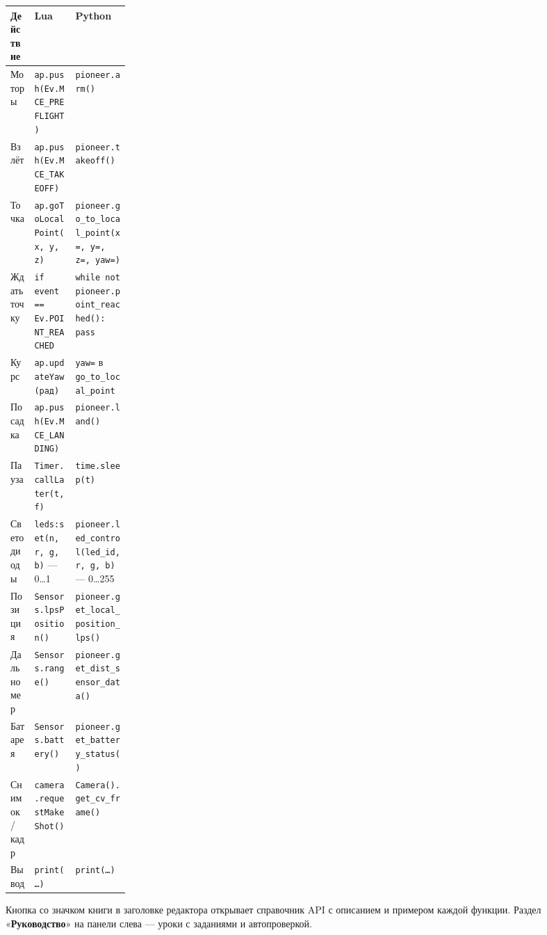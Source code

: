 \documentclass[11pt,a4paper]{article}
\newcommand{\ui}[1]{«\textbf{#1}»}
\begin{document}
\begin{center}
\small
\renewcommand{\arraystretch}{1.15}
\begin{tabularx}{\linewidth}{@{}>{\raggedright\arraybackslash}p{0.2\linewidth} >{\raggedright\arraybackslash}X >{\raggedright\arraybackslash}X@{}}
\toprule
\textbf{Действие} & \textbf{Lua} & \textbf{Python} \\
\midrule
Моторы          & \texttt{ap.push(Ev.MCE\_PREFLIGHT)} & \texttt{pioneer.arm()} \\
Взлёт           & \texttt{ap.push(Ev.MCE\_TAKEOFF)} & \texttt{pioneer.takeoff()} \\
Точка           & \texttt{ap.goToLocalPoint(x, y, z)} & \texttt{pioneer.go\_to\_local\_point(x=, y=, z=, yaw=)} \\
Ждать точку     & \texttt{if event == Ev.POINT\_REACHED} & \texttt{while not pioneer.point\_reached(): pass} \\
Курс            & \texttt{ap.updateYaw(рад)} & \texttt{yaw=} в \texttt{go\_to\_local\_point} \\
Посадка         & \texttt{ap.push(Ev.MCE\_LANDING)} & \texttt{pioneer.land()} \\
Пауза           & \texttt{Timer.callLater(t, f)} & \texttt{time.sleep(t)} \\
Светодиоды      & \texttt{leds:set(n, r, g, b)} — 0…1 & \texttt{pioneer.led\_control(led\_id, r, g, b)} — 0…255 \\
Позиция         & \texttt{Sensors.lpsPosition()} & \texttt{pioneer.get\_local\_position\_lps()} \\
Дальномер       & \texttt{Sensors.range()} & \texttt{pioneer.get\_dist\_sensor\_data()} \\
Батарея         & \texttt{Sensors.battery()} & \texttt{pioneer.get\_battery\_status()} \\
Снимок / кадр   & \texttt{camera.requestMakeShot()} & \texttt{Camera().get\_cv\_frame()} \\
Вывод           & \texttt{print(\dots)} & \texttt{print(\dots)} \\
\bottomrule
\end{tabularx}
\end{center}

\begin{tip}
Кнопка со значком книги в заголовке редактора открывает справочник API с описанием и примером каждой
функции. Раздел \ui{Руководство} на панели слева — уроки с заданиями и автопроверкой.
\end{tip}
\end{document}
